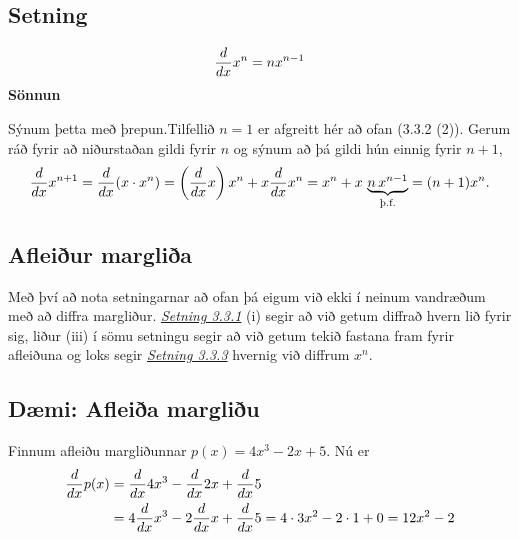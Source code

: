 \documentclass[a4paper,10pt,icelandic]{sphinxmanual}
\begin{document}
\subsection{Setning}
\label{kafli03:id5}\label{kafli03:setning-3-3-3}\begin{gather}
\begin{split}\frac{d}{dx} x^n = n x^{n-1}\end{split}\notag
\end{gather}
\textbf{Sönnun}

Sýnum þetta með þrepun.Tilfellið \(n=1\) er afgreitt hér að ofan
(3.3.2 (2)).
Gerum ráð fyrir að niðurstaðan gildi fyrir \(n\) og sýnum að þá
gildi hún einnig fyrir \(n+1\),
\begin{gather}
\begin{split}\frac{d}{dx} x^{n+1} = \frac{d}{dx} (x\cdot x^n) =
    \left(\frac{d}{dx} x\right) x^n + x\frac{d}{dx} x^n
    = x^n + x\,
    \underbrace{n\, x^{n-1}}_\text{þ.f.}
    = (n+1) x^n.\end{split}\notag
\end{gather}

\subsection{Afleiður margliða}
\label{kafli03:afleiur-marglia}
Með því að nota setningarnar að ofan þá eigum við ekki í neinum
vandræðum með að diffra margliður. {\hyperref[kafli03:setning\string-3\string-3\string-1]{\emph{Setning 3.3.1}}} (i) segir
að við getum diffrað hvern lið fyrir sig, liður (iii) í sömu setningu
segir að við getum tekið fastana fram fyrir afleiðuna og loks segir
{\hyperref[kafli03:setning\string-3\string-3\string-3]{\emph{Setning 3.3.3}}} hvernig við diffrum \(x^n\).


\subsection{Dæmi: Afleiða margliðu}
\label{kafli03:daemi-afleia-margliu}
Finnum afleiðu margliðunnar \(p(x) = 4x^3-2x + 5\). Nú er
\begin{gather}
\begin{split}\begin{aligned}
\frac{d}{dx} p(x)
&= \frac{d}{dx}4x^3 - \frac{d}{dx}2x + \frac{d}{dx}5 \\
&= 4\frac{d}{dx}x^3 -2\frac{d}{dx}x + \frac{d}{dx}5 =
4\cdot 3x^2 -2\cdot 1 + 0 = 12x^2-2\end{aligned}\end{split}\notag
\end{gather}
\end{document}
